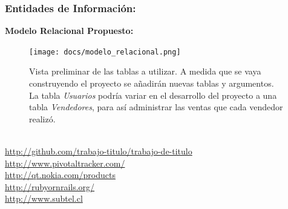 \documentclass[a4paper,12pt]{article}
\begin{document}
\newpage

\subsubsection{Entidades de Información:}

\textbf{Modelo Relacional Propuesto:}

\begin{figure}[!ht]
    \begin{center}
	\texttt{[image: docs/modelo\_relacional.png]}
    \end{center}
    \caption{Vista preliminar de las tablas a utilizar. A medida que se vaya construyendo el proyecto
             se añadirán nuevas tablas y argumentos.
	     La tabla \emph{Usuarios} podría variar en el desarrollo del proyecto a una tabla \emph{Vendedores}, 
	     para así administrar las ventas que cada vendedor realizó.}
\end{figure}

\newpage

\renewcommand{\refname}{\section{Referencias}}
\begin{thebibliography}{10}
  \\ \url{http://github.com/trabajo-titulo/trabajo-de-titulo}
  \\ \url{http://www.pivotaltracker.com/}
  \\ \url{http://qt.nokia.com/products}
  \\ \url{http://rubyornrails.org/}
  \\ \url{http://www.subtel.cl}
\end{thebibliography}
\end{document}
